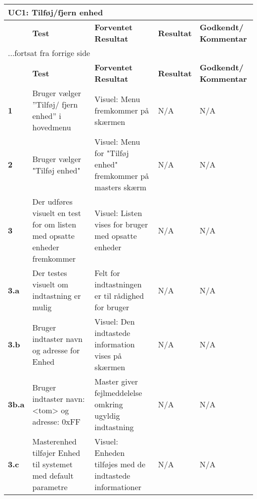 \begin{center}
\begin{longtable}{|p{}|p{}|p{}|p{}|p{}|} %
\hline
\multicolumn{5}{|l|}{\textbf{UC1: Tilføj/fjern enhed}} \\ \hline
\multicolumn{1}{|c|}{} &
\textbf{Test} &
\textbf{Forventet \newline Resultat} &
\textbf{Resultat} &
\textbf{Godkendt/ \newline Kommentar} \\ \hline 
\endfirsthead

\multicolumn{5}{l}{...fortsat fra forrige side} \\ \hline 
\multicolumn{1}{|c|}{} &
\textbf{Test} &
\textbf{Forventet \newline Resultat} &
\textbf{Resultat} &
\textbf{Godkendt/ \newline Kommentar} \\ \hline 
\endhead


\textbf{1}	&Bruger vælger ''Tilføj/ fjern enhed'' i hovedmenu 
			&Visuel: Menu fremkommer på skærmen 
			&N/A 
			&N/A \\\hline
			 
\textbf{2}	&Bruger vælger "Tilføj enhed" 
			&Visuel: Menu for "Tilføj enhed" fremkommer på masters skærm  
			&N/A 
			&N/A \\\hline
			 
\textbf{3}	&Der udføres visuelt en test for om listen med opsatte enheder fremkommer
			&Visuel: Listen vises for bruger med opsatte enheder
			&N/A 
			&N/A \\\hline
			 
\textbf{3.a}	&Der testes visuelt om indtastning er mulig
			&Felt for indtastningen er til rådighed for bruger
			&N/A
			&N/A \\\hline 
			
\textbf{3.b}&Bruger indtaster navn og adresse for Enhed
			&Visuel: Den indtastede information vises på skærmen 
			&N/A 
			&N/A \\\hline
			 
\textbf{3b.a}&Bruger indtaster navn: <tom> og adresse: 0xFF
			&Master giver fejlmeddelelse omkring ugyldig indtastning
			&N/A 
			&N/A \\\hline
						 
\textbf{3.c}&Masterenhed tilføjer Enhed til systemet med default parametre
			&Visuel: Enheden tilføjes med de indtastede informationer
			&N/A 
			&N/A \\\hline
			 

\end{longtable}
\end{center}
